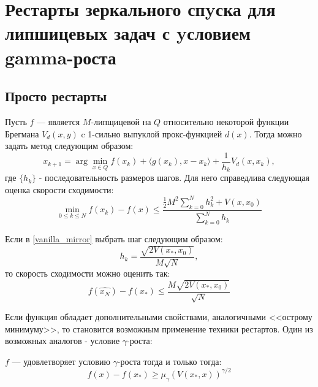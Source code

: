 \chapter{Рестарты зеркального спyска для липшицевых задач с yсловием gamma-роста}\label{ch:ch3}

\section{Просто рестарты}\label{sec:ch3/sect1}

\begin{theorem} \label{vanilla_mirror}
    Пусть $f$ --- является $M$-липщицевой на $Q$ относительно некоторой функции Брегмана $V_d(x, y)$ c 1-сильно выпуклой прокс-функцией $d(x)$. Тогда можно задать метод следующим образом:
    \begin{equation} \label{mirr_upd}
        x_{k+1} = \arg \min_{x \in Q} {f(x_k) + \langle g(x_k), x - x_k \rangle + \frac{1}{h_k} V_d(x, x_k)},
    \end{equation}
    где $\{ h_k \}$ - последовательность размеров шагов.
    Для него справедлива следующая оценка скорости сходимости:
    \begin{equation} \label{general_est}
        \min_{0\leq k \leq N} f(x_k) - f(x) \leq \frac{\frac{1}{2} M^2 \sum_{k=0}^N h_k^2 + V(x, x_0)}{\sum_{k=0}^N h_k}
    \end{equation}
\end{theorem}


\begin{remark}
    Если в \ref{vanilla_mirror} выбрать шаг следующим образом:
    \begin{equation} \label{mirr_step}
        h_{k} = \frac{\sqrt{2 V(x_*, x_0)}}{M\sqrt{N}},
    \end{equation}
    то скорость сходимости можно оценить так:
    \begin{equation} \label{mirr_est}
        f(\widehat{x_N}) - f(x_*) \leq \frac{M\sqrt{2V(x_*, x_0)}}{\sqrt{N}}
    \end{equation}
\end{remark}
Если функция обладает дополнительными свойствами, аналогичными <<острому минимуму>>,  то становится возможным применение техники рестартов. Один из возможных аналогов - условие $\gamma$-роста:

\begin{definition} \label{gamma-growth}
   $f$ --- удовлетворяет условию $\gamma$-роста тогда и только тогда:
   \begin{equation}
       f(x) - f(x_*) \geq \mu_{\gamma}(V(x_*,x))^{\gamma/2}
   \end{equation}
\end{definition}

